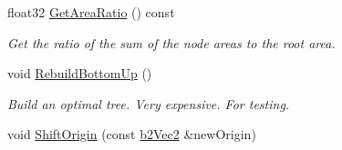 \begin{DoxyCompactItemize}
\item 
\mbox{\label{classb2DynamicTree_a87da9819c4f190faec38f7fe4608caae}} 
float32 \mbox{\hyperlink{classb2DynamicTree_a87da9819c4f190faec38f7fe4608caae}{Get\+Area\+Ratio}} () const
\begin{DoxyCompactList}\small\item\em Get the ratio of the sum of the node areas to the root area. \end{DoxyCompactList}\item 
\mbox{\label{classb2DynamicTree_abd146017cfec1cf5ea7b87331f30a3ff}} 
void \mbox{\hyperlink{classb2DynamicTree_abd146017cfec1cf5ea7b87331f30a3ff}{Rebuild\+Bottom\+Up}} ()
\begin{DoxyCompactList}\small\item\em Build an optimal tree. Very expensive. For testing. \end{DoxyCompactList}\item 
void \mbox{\hyperlink{classb2DynamicTree_af37ddfed6a5da97d5a78b09918d19ceb}{Shift\+Origin}} (const \mbox{\hyperlink{structb2Vec2}{b2\+Vec2}} \&new\+Origin)
\end{DoxyCompactItemize}
